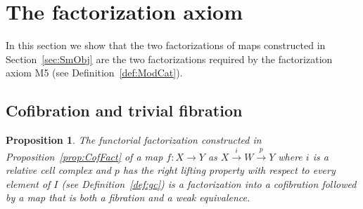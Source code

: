 \documentclass[12pt]{amsart}
\numberwithin{equation}{section}
\theoremstyle{slplain}
\newtheorem{prop}[equation]{Proposition}
\theoremstyle{definition}
\theoremstyle{remark}
\newcommand{\propref}{Proposition~\ref}
\newcommand{\defref}{Definition~\ref}
\newcommand{\secref}{Section~\ref}
\begin{document}
\section{The factorization axiom}
\label{sec:factor}

In this section we show that the two factorizations of maps
constructed in \secref{sec:SmObj} are the two factorizations required
by the factorization axiom M5 (see \defref{def:ModCat}).

\subsection{Cofibration and trivial fibration}
\label{sec:CofTrFib}

\begin{prop}
  \label{prop:CofTrFib}
  The functorial factorization constructed in \propref{prop:CofFact}
  of a map $f\colon X \to Y$ as $X \xrightarrow{i} W \xrightarrow{p}
  Y$ where $i$ is a relative cell complex and $p$ has the right
  lifting property with respect to every element of $I$ (see
  \defref{def:gc}) is a factorization into a cofibration followed by a
  map that is both a fibration and a weak equivalence.
\end{prop}
\end{document}
